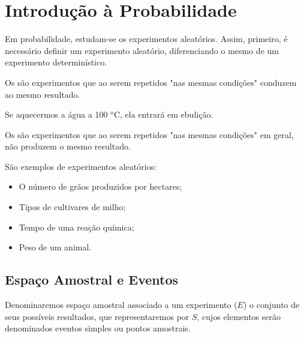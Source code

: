 \chapter{Introdução à Probabilidade}

Em probabilidade, estudam-se os experimentos aleatórios. Assim, primeiro, é necessário definir um experimento aleatório, diferenciando o mesmo de um experimento determinístico.

\begin{definition}
	Os  são experimentos que ao serem repetidos "nas mesmas condições" conduzem ao mesmo resultado.
\end{definition}

\begin{example}
	Se aquecermos a água a 100 $^{\text{o}}$C, ela entrará em ebulição.
\end{example}

\begin{definition}
	Os  são experimentos que ao serem repetidos "nas mesmas condições" em geral, não produzem o mesmo resultado.
\end{definition}

\begin{example}
	São exemplos de experimentos aleatórios:
	\begin{itemize}
		\item O número de grãos produzidos por hectares;
		\item Tipos de cultivares de milho;
		\item Tempo de uma reação química;
		\item Peso de um animal.
	\end{itemize}
\end{example}

\section{Espaço Amostral e Eventos}

\begin{definition}
	Denominaremos espaço amostral associado a um experimento ($E$) o conjunto de seus possíveis resultados, que representaremos por $S$, cujos elementos serão denominados eventos simples ou pontos amostrais.
\end{definition}

